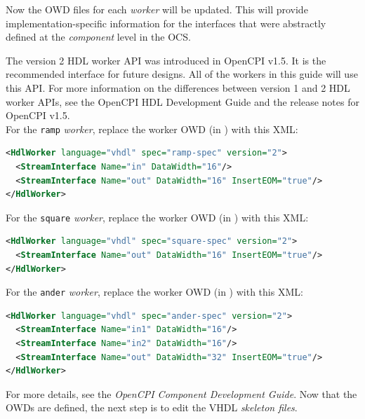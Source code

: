 Now the OWD files for each \textit{worker} will be updated. This will provide implementation-specific information for the interfaces that were abstractly defined at the \textit{component} level in the OCS.\newline

The version 2 HDL worker API was introduced in OpenCPI v1.5. It is the recommended interface for future designs. All of the workers in this guide will use this API. For more information on the differences between version 1 and 2 HDL worker APIs, see the OpenCPI HDL Development Guide and the release notes for OpenCPI v1.5.\\
\bstart
For the \verb+ramp+ \textit{worker}, replace the worker OWD (in ) with this XML:

\begin{lstlisting}[language=xml]
<HdlWorker language="vhdl" spec="ramp-spec" version="2">
  <StreamInterface Name="in" DataWidth="16"/>
  <StreamInterface Name="out" DataWidth="16" InsertEOM="true"/>
</HdlWorker>
\end{lstlisting}
\bend

\bstart
For the \verb+square+ \textit{worker}, replace the worker OWD (in ) with this XML:

\begin{lstlisting}[language=xml]
<HdlWorker language="vhdl" spec="square-spec" version="2">
  <StreamInterface Name="out" DataWidth="16" InsertEOM="true"/>
</HdlWorker>
\end{lstlisting}
\bend
\bstart
For the \verb+ander+ \textit{worker}, replace the worker OWD (in ) with this XML:

\begin{lstlisting}[language=xml]
<HdlWorker language="vhdl" spec="ander-spec" version="2">
  <StreamInterface Name="in1" DataWidth="16"/>
  <StreamInterface Name="in2" DataWidth="16"/>
  <StreamInterface Name="out" DataWidth="32" InsertEOM="true"/>
</HdlWorker>
\end{lstlisting}
\bend

For more details, see the \textit{OpenCPI Component Development Guide}. Now that the OWDs are defined, the next step is to edit the VHDL \textit{skeleton files}.

